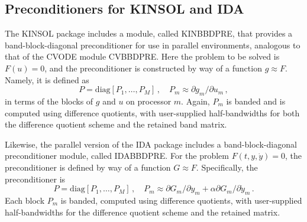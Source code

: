 \subsection{Preconditioners for KINSOL and IDA}

The KINSOL package includes a module, called
KINBBDPRE, that provides a band-block-diagonal preconditioner
for use in parallel environments,
analogous to that of the CVODE module CVBBDPRE.  Here the problem to
be solved is $F(u) = 0$, and the preconditioner is constructed by way
of a function $g \approx F$.  Namely, it is defined as
\begin{equation*}
  P = \mbox{diag}[P_1,\ldots,P_M] \, , \quad
  P_m \approx \partial g_m / \partial u_m \, ,
\end{equation*}
in terms of the blocks of $g$ and $u$ on processor $m$.  Again, $P_m$
is banded and is computed using difference quotients, with user-supplied
half-bandwidths for both the difference quotient scheme and the
retained band matrix.

Likewise, the parallel version of the IDA package includes a
band-block-diagonal preconditioner module, called IDABBDPRE.  For the
problem $F(t,y,{\dot y}) = 0$, the preconditioner is defined by way of a
function $G \approx F$.  Specifically, the preconditioner is
\begin{equation*}
  P = \mbox{diag}[P_1,\ldots,P_M] \, ,
  \quad P_m \approx \partial G_m / \partial y_m
  + \alpha \partial G_m / \partial {\dot y}_m \, . 
\end{equation*}
Each block $P_m$ is banded, computed using difference quotients, with
user-supplied half-bandwidths for the difference quotient scheme and
the retained matrix.

